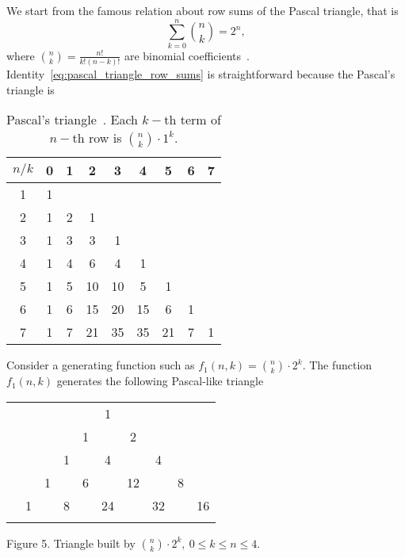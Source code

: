 We start from the famous relation about row sums of the Pascal triangle, that is
\begin{equation}
    \sum_{k=0}^{n}\binom{n}{k} = 2^n,
    \label{eq:pascal_triangle_row_sums}
\end{equation}
where $\binom{n}{k} = \frac{n!}{k!(n-k)!}$ are binomial coefficients~\cite{graham1989concrete}.
Identity~\ref{eq:pascal_triangle_row_sums} is straightforward because the Pascal's triangle is
\begin{table}[H]
    \begin{tabular}{c|cccccccc}
        $n/k$ & 0 & 1 & 2  & 3  & 4  & 5  & 6 & 7 \\ [3px]
        \hline
        1     & 1 &   &    &    &    &    &   &   \\
        2     & 1 & 2 & 1  &    &    &    &   &   \\
        3     & 1 & 3 & 3  & 1  &    &    &   &   \\
        4     & 1 & 4 & 6  & 4  & 1  &    &   &   \\
        5     & 1 & 5 & 10 & 10 & 5  & 1  &   &   \\
        6     & 1 & 6 & 15 & 20 & 15 & 6  & 1 &   \\
        7     & 1 & 7 & 21 & 35 & 35 & 21 & 7 & 1
    \end{tabular}
    \caption{Pascal's triangle~\cite{conway1996pascal}.
    Each $k-$th term of $n-$th row is $\binom{n}{k}\cdot 1^k$.} \label{tab:pascal_triagnle}
\end{table}
Consider a generating function such as $f_1(n,k) = \binom{n}{k}\cdot 2^k$.
The function $f_1(n,k)$ generates the following Pascal-like triangle
\begin{center}
    \begin{tabular}{rccccccccc}
        & & & & & 1 \\\noalign{\smallskip\smallskip}
        & & & & 1 & & 2 \\\noalign{\smallskip\smallskip}
        & & & 1 & & 4 & & 4 \\\noalign{\smallskip\smallskip}
        & & 1 & & 6 & & 12 & & 8 \\\noalign{\smallskip\smallskip}
        & 1 & & 8 & & 24 & & 32 & & 16 \\\noalign{\smallskip\smallskip}
    \end{tabular}
\end{center}
\begin{center}
    Figure 5. Triangle built by $\binom{n}{k}\cdot 2^k, \ 0\leq k\leq n\leq 4$.\\
\end{center}
